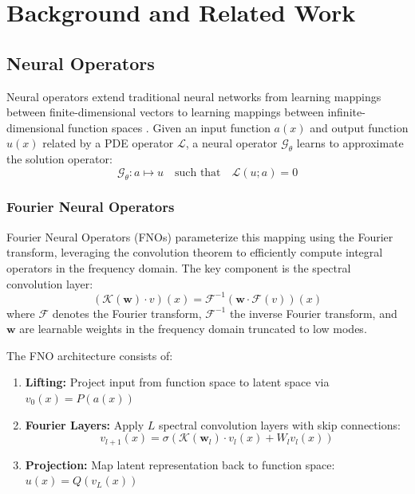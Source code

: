 \section{Background and Related Work}

\subsection{Neural Operators}

Neural operators extend traditional neural networks from learning mappings between finite-dimensional vectors to learning mappings between infinite-dimensional function spaces \cite{lu2021deeponet,chen1995universal}. Given an input function $a(x)$ and output function $u(x)$ related by a PDE operator $\mathcal{L}$, a neural operator $\mathcal{G}_\theta$ learns to approximate the solution operator:
\begin{equation}
    \mathcal{G}_\theta: a \mapsto u \quad \text{such that} \quad \mathcal{L}(u; a) = 0
\end{equation}

\subsubsection{Fourier Neural Operators}

Fourier Neural Operators (FNOs) \cite{li2020fourier} parameterize this mapping using the Fourier transform, leveraging the convolution theorem to efficiently compute integral operators in the frequency domain. The key component is the spectral convolution layer:
\begin{equation}
    (\mathcal{K}(\mathbf{w}) \cdot v)(x) = \mathcal{F}^{-1}\left( \mathbf{w} \cdot \mathcal{F}(v) \right)(x)
\end{equation}
where $\mathcal{F}$ denotes the Fourier transform, $\mathcal{F}^{-1}$ the inverse Fourier transform, and $\mathbf{w}$ are learnable weights in the frequency domain truncated to low modes.

The FNO architecture consists of:
\begin{enumerate}
    \item \textbf{Lifting:} Project input from function space to latent space via $v_0(x) = P(a(x))$
    \item \textbf{Fourier Layers:} Apply $L$ spectral convolution layers with skip connections:
    \begin{equation}
        v_{l+1}(x) = \sigma\left( \mathcal{K}(\mathbf{w}_l) \cdot v_l(x) + W_l v_l(x) \right)
    \end{equation}
    \item \textbf{Projection:} Map latent representation back to function space: $u(x) = Q(v_L(x))$
\end{enumerate}

